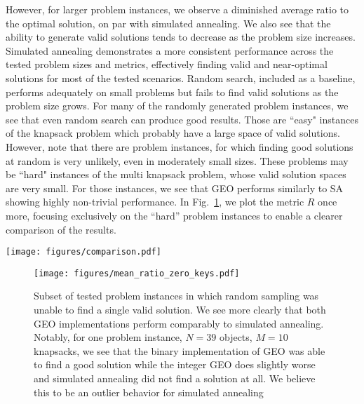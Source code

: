 However, for larger problem instances, we observe a diminished average ratio to the optimal solution, on par with simulated annealing. We also see that the ability to generate valid solutions tends to decrease as the problem size increases.  Simulated annealing demonstrates a more consistent performance across the tested problem sizes and metrics, effectively finding valid and near-optimal solutions for most of the tested scenarios. Random search, included as a baseline, performs adequately on small problems but fails to find valid solutions as the problem size grows. For many of the randomly generated problem instances, we see that even random search can produce good results. Those are ``easy" instances of the knapsack problem which probably have a large space of valid solutions. However, note that there are problem instances, for which finding good solutions at random is very unlikely, even in moderately small sizes. These problems may be ``hard" instances of the multi knapsack problem, whose valid solution spaces are very small. For those instances, we see that GEO performs similarly to SA showing highly non-trivial performance. In Fig.~\ref{fig:hard_problems}, we plot the metric $R$ once more, focusing exclusively on the ``hard'' problem instances to enable a clearer comparison of the results.

\begin{figure*}[ht]
    \centering
    \texttt{[image: figures/comparison.pdf]}
    \caption{Each method is run 10 times for every problem size (Integer and Binary also use different hyper-parameters from Table~\ref{table:hyper_parameters}),
selecting the configuration that maximizes the number of valid solutions at convergence (enforced via a penalty coefficient).
If multiple configurations yield the same number of valid solutions, we choose the one with the highest ratio to the optimal cost. Top plot: The average ratio of the best valid solution's cost to the known optimal, with error bars. Middle plot: The proportion of valid solutions (fulfilling both inequality and equality constraints) among all runs for each method. Bottom plot: The ``exploration ratio,'' computed as the maximum number of objective-function evaluations (across all parameter configurations)
divided by the problem size.
In all plots, the $x$-axis indicates the number of samples satisfying the cardinality constraint for each problem.}
    \label{fig:scenario_comparisons_full}
\end{figure*}

\begin{figure}[ht]
    \centering
    \texttt{[image: figures/mean\_ratio\_zero\_keys.pdf]}
    \caption{Subset of tested problem instances in which random sampling was unable to find a single valid solution. We see more clearly that both GEO implementations perform comparably to simulated annealing. Notably, for one problem instance, $N=39$ objects, $M=10$ knapsacks, we see that the binary implementation of GEO was able to find a good solution while the integer GEO does slightly worse and simulated annealing did not find a solution at all. We believe this to be an outlier behavior for simulated annealing}
    \label{fig:hard_problems}
\end{figure}

